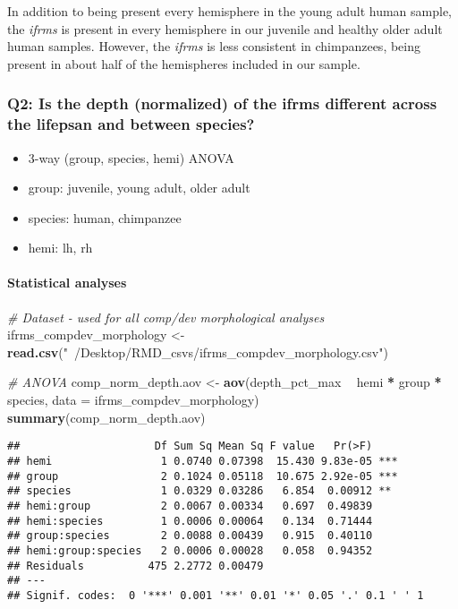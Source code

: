 \documentclass[
]{article}
\newenvironment{Shaded}{\begin{snugshade}}{\end{snugshade}}
\newcommand{\CommentTok}[1]{\textcolor[rgb]{0.56,0.35,0.01}{\textit{#1}}}
\newcommand{\DataTypeTok}[1]{\textcolor[rgb]{0.13,0.29,0.53}{#1}}
\newcommand{\KeywordTok}[1]{\textcolor[rgb]{0.13,0.29,0.53}{\textbf{#1}}}
\newcommand{\NormalTok}[1]{#1}
\newcommand{\OperatorTok}[1]{\textcolor[rgb]{0.81,0.36,0.00}{\textbf{#1}}}
\newcommand{\StringTok}[1]{\textcolor[rgb]{0.31,0.60,0.02}{#1}}
\providecommand{\tightlist}{%
  \setlength{\itemsep}{0pt}\setlength{\parskip}{0pt}}
\begin{document}
In addition to being present every hemisphere in the young adult human
sample, the \emph{ifrms} is present in every hemisphere in our juvenile
and healthy older adult human samples. However, the \emph{ifrms} is less
consistent in chimpanzees, being present in about half of the
hemispheres included in our sample.

\hypertarget{q2-is-the-depth-normalized-of-the-ifrms-different-across-the-lifepsan-and-between-species}{%
\subsubsection{Q2: Is the depth (normalized) of the ifrms different
across the lifepsan and between
species?}\label{q2-is-the-depth-normalized-of-the-ifrms-different-across-the-lifepsan-and-between-species}}

\begin{itemize}
\tightlist
\item
  3-way (group, species, hemi) ANOVA
\item
  group: juvenile, young adult, older adult
\item
  species: human, chimpanzee
\item
  hemi: lh, rh
\end{itemize}

\hypertarget{statistical-analyses}{%
\paragraph{Statistical analyses}\label{statistical-analyses}}

\begin{Shaded}
\begin{Highlighting}[]
\CommentTok{# Dataset - used for all comp/dev morphological analyses}
\NormalTok{ifrms_compdev_morphology <-}\StringTok{ }\KeywordTok{read.csv}\NormalTok{(}\StringTok{"~/Desktop/RMD_csvs/ifrms_compdev_morphology.csv"}\NormalTok{)}

\CommentTok{# ANOVA}
\NormalTok{comp_norm_depth.aov <-}\StringTok{ }\KeywordTok{aov}\NormalTok{(depth_pct_max }\OperatorTok{~}\StringTok{ }\NormalTok{hemi }\OperatorTok{*}\StringTok{ }\NormalTok{group }\OperatorTok{*}\StringTok{ }\NormalTok{species, }\DataTypeTok{data =}\NormalTok{ ifrms_compdev_morphology)}
\KeywordTok{summary}\NormalTok{(comp_norm_depth.aov)}
\end{Highlighting}
\end{Shaded}

\begin{verbatim}
##                     Df Sum Sq Mean Sq F value   Pr(>F)    
## hemi                 1 0.0740 0.07398  15.430 9.83e-05 ***
## group                2 0.1024 0.05118  10.675 2.92e-05 ***
## species              1 0.0329 0.03286   6.854  0.00912 ** 
## hemi:group           2 0.0067 0.00334   0.697  0.49839    
## hemi:species         1 0.0006 0.00064   0.134  0.71444    
## group:species        2 0.0088 0.00439   0.915  0.40110    
## hemi:group:species   2 0.0006 0.00028   0.058  0.94352    
## Residuals          475 2.2772 0.00479                     
## ---
## Signif. codes:  0 '***' 0.001 '**' 0.01 '*' 0.05 '.' 0.1 ' ' 1
\end{verbatim}
\end{document}
